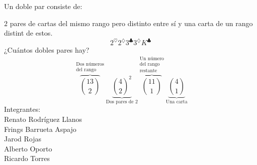 \documentclass[../main.tex]{subfiles}
\begin{document}
Un doble par consiste de:

$2$ pares de cartas del mismo rango pero distinto entre sí y una carta de un rango
distint de estos.
\[
	2^\heartsuit2^\diamondsuit3^\clubsuit3^\diamondsuit K^\clubsuit
\]
¿Cuántos dobles pares hay?
\[
	\overbrace{ \binom{13}{2} }^{\substack{\text{Dos números}\\\text{del rango}} }
	\underbrace{ \binom{4}{2}^2 }_{\text{Dos pares de 2}}
	\overbrace{ \binom{11}{1} }^{\substack{\text{Un número}\\\text{del rango}\\\text{restante}} }
	\underbrace{ \binom{4}{1} }_{\text{Una carta}}
\]
Integrantes:\\
Renato Rodríguez Llanos\\
Frings Barrueta Aspajo\\
Jarod Rojas\\
Alberto Oporto\\
Ricardo Torres
\end{document}
